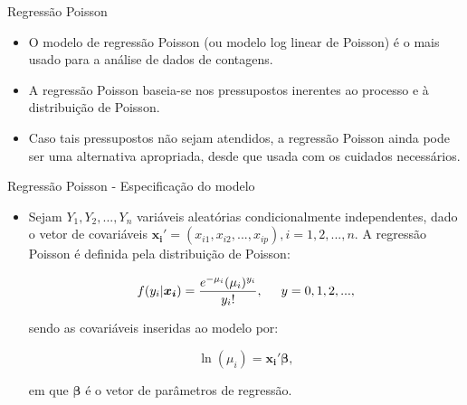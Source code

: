 \documentclass[10pt, aspectratio=169]{beamer}
\begin{document}

\begin{frame}{Regressão Poisson} 

\begin{itemize}
    \item O modelo de regressão Poisson (ou modelo log linear de Poisson) é o mais usado para a análise de dados de contagens.
    
    \vspace{0,5cm}
    
    \item A regressão Poisson baseia-se nos pressupostos inerentes ao processo e à distribuição de Poisson.
    
    \vspace{0,5cm}
    
    \item Caso tais pressupostos não sejam atendidos, a regressão Poisson ainda pode ser uma alternativa apropriada, desde que usada com os cuidados necessários.
    
\end{itemize}

\end{frame}



\begin{frame}{Regressão Poisson - Especificação do modelo} 

\begin{itemize}
    \item Sejam $Y_{1},Y_{2},...,Y_{n}$ variáveis aleatórias condicionalmente independentes, dado o vetor de covariáveis ${\boldsymbol{x_{i}}}'=(x_{i1},x_{i2},...,x_{ip}), i=1,2,...,n$. A regressão Poisson é definida pela distribuição de Poisson:


$$
   f(y_{i}|\boldsymbol{x_{i}})=\frac{e^{-\mu_{i}}(\mu_{i})^{y_{i}}}{y_{i}!},\hspace{5mm}y=0,1,2,...,
$$

\vspace{0,2cm}
 
sendo as covariáveis inseridas ao modelo por:

$$
\ln(\mu _{i})=\boldsymbol{x_{i}'} \boldsymbol{\beta},
$$

\vspace{0,2cm}
 
em que ${\boldsymbol{\beta }}$ é o vetor de parâmetros de regressão.
 

\end{itemize}

\end{frame}
\end{document}
